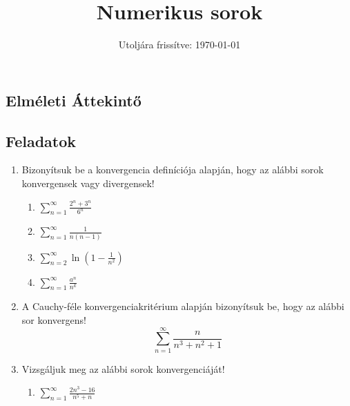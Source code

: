 \documentclass[a4paper, 12pt]{scrartcl}
\title{Numerikus sorok}
\date{Utoljára frissítve: \today}
\begin{document}
\maketitle

\subsection{Elméleti Áttekintő}

\clearpage
\subsection{Feladatok}

\begin{enumerate}
  \item Bizonyítsuk be a konvergencia definíciója alapján, hogy az alábbi sorok
        konvergensek vagy divergensek!
        \begin{multicols}{2}
          \begin{enumerate}
            \item $\displaystyle
                    \sum_{n = 1}^\infty \frac{2^n + 3^n}{6^n}
                  $

            \item $\displaystyle
                    \sum_{n = 1}^\infty \frac{1}{n (n - 1)}
                  $

            \item $\displaystyle
                    \sum_{n = 2}^\infty \ln \left( 1 - \frac{1}{n^2} \right)
                  $

            \item $\displaystyle
                    \sum_{n = 1}^\infty \frac{a^n}{n^k}
                  $
          \end{enumerate}
        \end{multicols}

  \item A Cauchy-féle konvergenciakritérium alapján bizonyítsuk be, hogy az
        alábbi sor konvergens!
        \[
          \sum_{n = 1}^\infty \frac{n}{n^3 + n^2 + 1}
        \]

  \item Vizsgáljuk meg az alábbi sorok konvergenciáját!
        \begin{multicols}{3}
          \begin{enumerate}
            \item $\displaystyle
                    \sum_{n = 1}^\infty \frac{2n^3 - 16}{n^5 + n}
                  $


\end{enumerate}
\end{multicols}
\end{enumerate}
\end{document}
